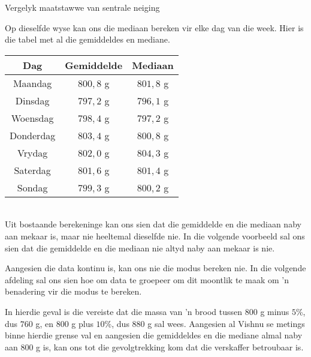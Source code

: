 \begin{wex}{
Vergelyk maatstawwe van sentrale neiging
}
{  Op dieselfde wyse kan ons die mediaan bereken vir elke dag van die week. Hier is die tabel met al die gemiddeldes en mediane. 
\\
  \begin{center}
    \begin{tabular}{|c|c|c|} \hline
      \textbf{Dag} & \textbf{Gemiddelde} &\textbf{Mediaan} \\  \hline
      Maandag & $800,8$ g & $801,8$ g \\ \hline
      Dinsdag & $797,2$ g & $796,1$ g \\ \hline
      Woensdag & $798,4$ g & $797,2$ g \\ \hline
      Donderdag & $803,4$ g & $800,8$ g \\ \hline
      Vrydag & $802,0$ g & $804,3$ g \\ \hline
      Saterdag & $801,6$ g & $801,4$ g \\ \hline
      Sondag & $799,3$ g & $800,2$ g \\ \hline
    \end{tabular}
  \end{center}
\vspace{8pt}\\
  Uit bostaande berekeninge kan ons sien dat die gemiddelde en die mediaan naby aan mekaar is, maar nie heeltemal dieselfde nie. In die volgende voorbeeld sal ons sien dat die gemiddelde en die mediaan nie altyd naby aan mekaar is nie.


  Aangesien die data kontinu is, kan ons nie die modus bereken nie. In die volgende afdeling sal ons sien hoe om data te groepeer om dit moontlik te maak om ’n benadering vir die modus te bereken.


  In hierdie geval is die vereiste dat die massa van ’n brood tussen $800$ g minus $5$\%, dus $760$ g, en $800$ g plus 
  $10$\%, dus $880$ g sal wees. Aangesien al Vishnu se metings binne hierdie grense val en aangesien die gemiddeldes en die mediane almal naby aan $800$ g is, kan ons tot die gevolgtrekking kom dat die verskaffer betroubaar is.
}
\end{wex}


